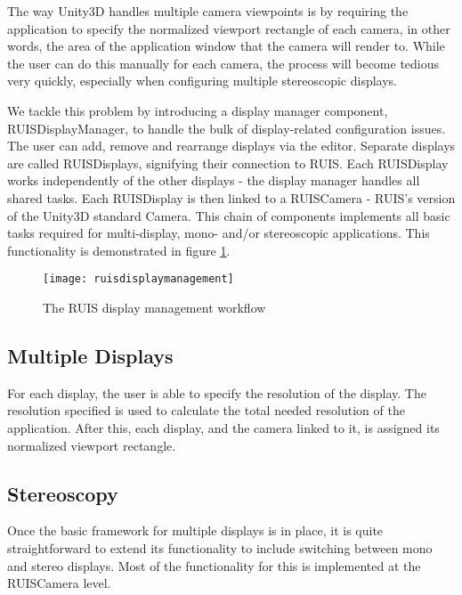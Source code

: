 \documentclass[12pt,a4paper,oneside,pdftex]{report}
\begin{document}
The way Unity3D handles multiple camera viewpoints is by requiring the application to specify the normalized viewport rectangle of each camera, in other words, the area of the application window that the camera will render to. While the user can do this manually for each camera, the process will become tedious very quickly, especially when configuring multiple stereoscopic displays. 

We tackle this problem by introducing a display manager component, RUISDisplayManager, to handle the bulk of display-related configuration issues. The user can add, remove and rearrange displays via the editor. Separate displays are called RUISDisplays, signifying their connection to RUIS. Each RUISDisplay works independently of the other displays - the display manager handles all shared tasks. Each RUISDisplay is then linked to a RUISCamera - RUIS's version of the Unity3D standard Camera. This chain of components implements all basic tasks required for multi-display, mono- and/or stereoscopic applications. This functionality is demonstrated in figure \ref{fig:displaymanagement}.

\begin{figure}[h]
\centering
\texttt{[image: ruisdisplaymanagement]}
\caption{The RUIS display management workflow}
\label{fig:displaymanagement}
\end{figure}

\subsection{Multiple Displays}
\label{subsection:multidisplaysystems:multipledisplays}

For each display, the user is able to specify the resolution of the display. The resolution specified is used to calculate the total needed resolution of the application. After this, each display, and the camera linked to it, is assigned its normalized viewport rectangle. 



\subsection{Stereoscopy}
\label{subsection:multidisplaysystems:stereoscopy}

Once the basic framework for multiple displays is in place, it is quite straightforward to extend its functionality to include switching between mono and stereo displays. Most of the functionality for this is implemented at the RUISCamera level.
\end{document}
